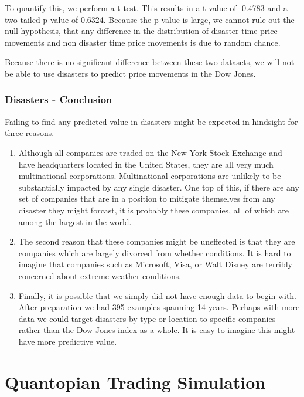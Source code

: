 \documentclass{report}
\begin{document}
To quantify this, we perform a t-test. This results in a t-value of -0.4783 and a two-tailed p-value of 0.6324. Because the p-value is large, we cannot rule out the null hypothesis, that any difference in the distribution of disaster time price movements and non disaster time price movements is due to random chance.

Because there is no significant difference between these two datasets, we will not be able to use disasters to predict price movements in the Dow Jones.

\subsection{Disasters - Conclusion}

Failing to find any predicted value in disasters might be expected in hindsight for three reasons.

\begin{enumerate}
  \item Although all companies are traded on the New York Stock Exchange and have headquarters located in the United States, they are all very much multinational corporations. Multinational corporations are unlikely to be substantially impacted by any single disaster. One top of this, if there are any set of companies that are in a position to mitigate themselves from any disaster they might forcast, it is probably these companies, all of which are among the largest in the world.
  
  \item The second reason that these companies might be uneffected is that they are companies which are largely divorced from whether conditions. It is hard to imagine that companies such as Microsoft, Visa, or Walt Disney are terribly concerned about extreme weather conditions.
  
  \item Finally, it is possible that we simply did not have enough data to begin with. After preparation we had 395 examples spanning 14 years. Perhaps with more data we could target disasters by type or location to specific companies rather than the Dow Jones index as a whole. It is easy to imagine this might have more predictive value.
  
\end{enumerate}

\chapter{Quantopian Trading Simulation}
\end{document}
